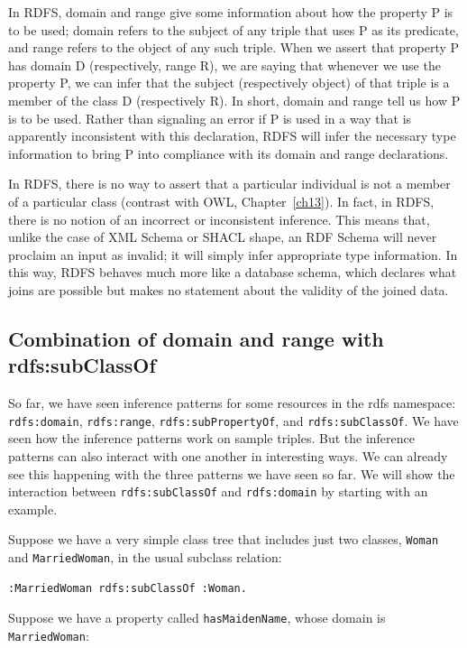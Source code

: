 In RDFS, domain and range give some information about how the property P
is to be used; domain refers to the subject of any triple that uses P as
its predicate, and range refers to the object of any such triple. When
we assert that property P has domain D (respectively, range R), we are
saying that whenever we use the property P, we can infer that the
subject (respectively object) of that triple is
a member of the class D (respectively R). In short, domain and range
tell us how P is to be used. Rather than signaling an error if P is used
in a way that is apparently inconsistent with this declaration, RDFS
will infer the necessary type information to bring P into compliance
with its domain and range declarations.

In RDFS, there is no way to assert that a particular individual is not a
member of a particular class (contrast with OWL, Chapter~\ref{ch13}). In fact,
in RDFS, there is no notion of an incorrect or inconsistent inference.
This means that, unlike the case of XML Schema or SHACL shape, an RDF
Schema will never proclaim an input as invalid; it will simply infer
appropriate type information. In this way, RDFS behaves much more like a
database schema, which declares what joins are possible but makes no
statement about the validity of the joined data.

\subsection{Combination of domain and range with rdfs:subClassOf}

So far, we have seen inference patterns for some resources in the rdfs
namespace: \texttt{rdfs:domain}, \texttt{rdfs:range}, \texttt{rdfs:subPropertyOf}, and
\texttt{rdfs:subClassOf}. We have seen how the inference patterns work on sample
triples. But the inference patterns can also interact with one another
in interesting ways. We can already see this happening with the three
patterns we have seen so far. We will show the interaction between
\texttt{rdfs:subClassOf} and \texttt{rdfs:domain} by starting with an example.

Suppose we have a very simple class tree that includes just two classes,
\texttt{Woman} and \texttt{MarriedWoman}, in the usual subclass relation:

\begin{lstlisting}
:MarriedWoman rdfs:subClassOf :Woman.
\end{lstlisting}

Suppose we have a property called \texttt{hasMaidenName}, whose domain is
\texttt{MarriedWoman}:


